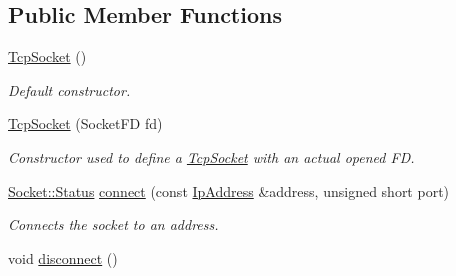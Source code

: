 \subsection*{Public Member Functions}
\begin{DoxyCompactItemize}
\item 
\hypertarget{classmognetwork_1_1_tcp_socket_ae3ffb22c96fde72fbf2723c6f250f3be}{\hyperlink{classmognetwork_1_1_tcp_socket_ae3ffb22c96fde72fbf2723c6f250f3be}{Tcp\-Socket} ()}\label{classmognetwork_1_1_tcp_socket_ae3ffb22c96fde72fbf2723c6f250f3be}

\begin{DoxyCompactList}\small\item\em Default constructor. \end{DoxyCompactList}\item 
\hyperlink{classmognetwork_1_1_tcp_socket_abd9e4da7abe977703de3d10aa02ec3c0}{Tcp\-Socket} (Socket\-F\-D fd)
\begin{DoxyCompactList}\small\item\em Constructor used to define a \hyperlink{classmognetwork_1_1_tcp_socket}{Tcp\-Socket} with an actual opened F\-D. \end{DoxyCompactList}\item 
\hyperlink{classmognetwork_1_1_socket_aa187a8394ac0d6203af0ec7f021ca15f}{Socket\-::\-Status} \hyperlink{classmognetwork_1_1_tcp_socket_a370b1ee9cfd40eb1c8a2a4ee47303363}{connect} (const \hyperlink{classmognetwork_1_1_ip_address}{Ip\-Address} \&address, unsigned short port)
\begin{DoxyCompactList}\small\item\em Connects the socket to an address. \end{DoxyCompactList}\item 
\hypertarget{classmognetwork_1_1_tcp_socket_a4da14b8d1e0f71bfae8c0fe6eb54be19}{void \hyperlink{classmognetwork_1_1_tcp_socket_a4da14b8d1e0f71bfae8c0fe6eb54be19}{disconnect} ()}\label{classmognetwork_1_1_tcp_socket_a4da14b8d1e0f71bfae8c0fe6eb54be19}


\end{DoxyCompactItemize}
